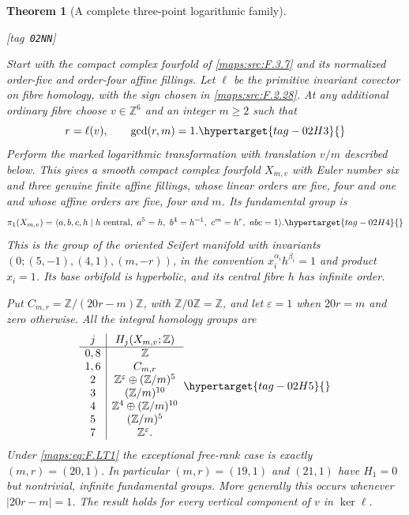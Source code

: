 \documentclass[11pt,a4paper]{article}
\numberwithin{equation}{section}
\newtheorem{theorem}{Theorem}[section]
\theoremstyle{definition}
\newcommand{\StatementRecord}[4]{{\upshape\footnotesize[tag~\texttt{#3}]}\enspace\ignorespaces}
\begin{document}
\begin{theorem}[A complete three-point logarithmic family]\hypertarget{tag-02NN}{}\label{maps:src:F.2.32}
\StatementRecord{maps:src:F.2.32}{proved}{02NN}{\cref{maps:src:F.3.7}, \cref{maps:src:F.2.28}, \eqref{maps:eq:F.LT4}, \eqref{maps:eq:F.LT5}, \cref{pub:V:smooth-gluing}, \eqref{maps:eq:F.HC8}, \eqref{maps:eq:F.HC9}, \eqref{maps:eq:F.LT8}, \cref{maps:src:F.2.29}, \eqref{maps:eq:F.LT6}, \eqref{maps:eq:F.LT9}}


Start with the compact complex fourfold of \ref{maps:src:F.3.7} and its
normalized order-five and order-four affine fillings.
Let $\ell$ be the primitive invariant covector on fibre
homology, with the sign chosen in \ref{maps:src:F.2.28}.
At any additional ordinary fibre choose
$v\in\mathbb Z^6$ and an integer $m\ge2$ such that
\begin{equation}
 r=\ell(v),\qquad \gcd(r,m)=1.
\hypertarget{tag-02H3}{}\label{maps:eq:F.LT1}
\end{equation}
Perform the marked logarithmic transformation with
translation $v/m$ described below.
This gives a smooth compact complex fourfold $X_{m,v}$
with Euler number six and three genuine finite affine
fillings, whose linear orders are five, four and one
and whose affine orders are five, four and $m$.
Its fundamental group is
\begin{equation}
 \pi_1(X_{m,v})=
 \langle a,b,c,h\mid h\text{ central},\
   a^5=h,\ b^4=h^{-1},\ c^m=h^r,\ abc=1\rangle .
\hypertarget{tag-02H4}{}\label{maps:eq:F.LT2}
\end{equation}
This is the group of the oriented Seifert manifold
with invariants
$(0;(5,-1),(4,1),(m,-r))$, in the convention
$x_i^{\alpha_i}h^{\beta_i}=1$ and product $x_i=1$.
Its base orbifold is hyperbolic, and its central fibre
$h$ has infinite order.

Put $C_{m,r}=\mathbb Z/(20r-m)\mathbb Z$, with
$\mathbb Z/0\mathbb Z=\mathbb Z$, and let
$\varepsilon=1$ when $20r=m$ and zero otherwise.
All the integral homology groups are
\begin{equation}
\begin{array}{c|c}
j&H_j(X_{m,v};\mathbb Z)\\ \hline
0,8&\mathbb Z\\
1,6&C_{m,r}\\
2&\mathbb Z^\varepsilon\oplus(\mathbb Z/m)^5\\
3&(\mathbb Z/m)^{10}\\
4&\mathbb Z^4\oplus(\mathbb Z/m)^{10}\\
5&(\mathbb Z/m)^5\\
7&\mathbb Z^\varepsilon .
\end{array}
\hypertarget{tag-02H5}{}\label{maps:eq:F.LT3}
\end{equation}
Under \eqref{maps:eq:F.LT1} the exceptional free-rank case is exactly
$(m,r)=(20,1)$.
In particular $(m,r)=(19,1)$ and $(21,1)$ have
$H_1=0$ but nontrivial, infinite fundamental groups.
More generally this occurs whenever $|20r-m|=1$.
The result holds for every vertical component of $v$ in $\ker\ell$.

\end{theorem}
\end{document}
